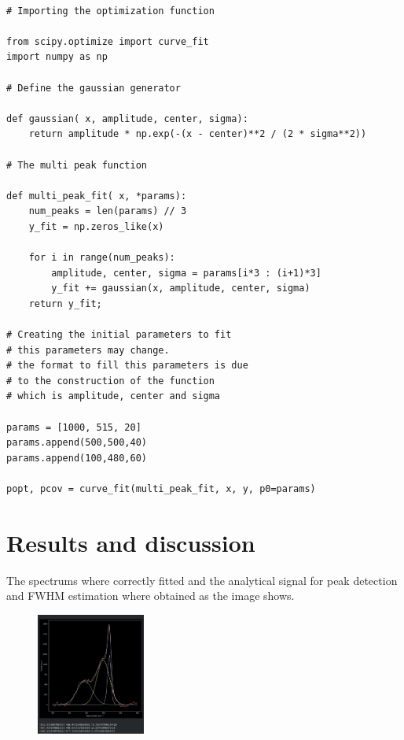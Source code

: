 \documentclass[a4paper,10pt,twocolumn]{article}
\begin{document}
\begin{lstlisting}[basicstyle=\fontsize{5}{4}\selectfont\ttfamily]

# Importing the optimization function

from scipy.optimize import curve_fit
import numpy as np

# Define the gaussian generator

def gaussian( x, amplitude, center, sigma):
    return amplitude * np.exp(-(x - center)**2 / (2 * sigma**2))

# The multi peak function

def multi_peak_fit( x, *params):
    num_peaks = len(params) // 3
    y_fit = np.zeros_like(x)

    for i in range(num_peaks):
        amplitude, center, sigma = params[i*3 : (i+1)*3]
        y_fit += gaussian(x, amplitude, center, sigma)
    return y_fit;

# Creating the initial parameters to fit
# this parameters may change.
# the format to fill this parameters is due
# to the construction of the function
# which is amplitude, center and sigma

params = [1000, 515, 20]
params.append(500,500,40)
params.append(100,480,60)

popt, pcov = curve_fit(multi_peak_fit, x, y, p0=params)

\end{lstlisting}

\section{Results and discussion}

The spectrums where correctly fitted and the analytical signal for peak detection and FWHM estimation where obtained as the image shows.

\begin{figure}[h]
  \centering
  \includegraphics[width=0.9\columnwidth, height=4cm]{Screenshot_2023-05-23_09-32-39.png}
\end{figure}
\end{document}
